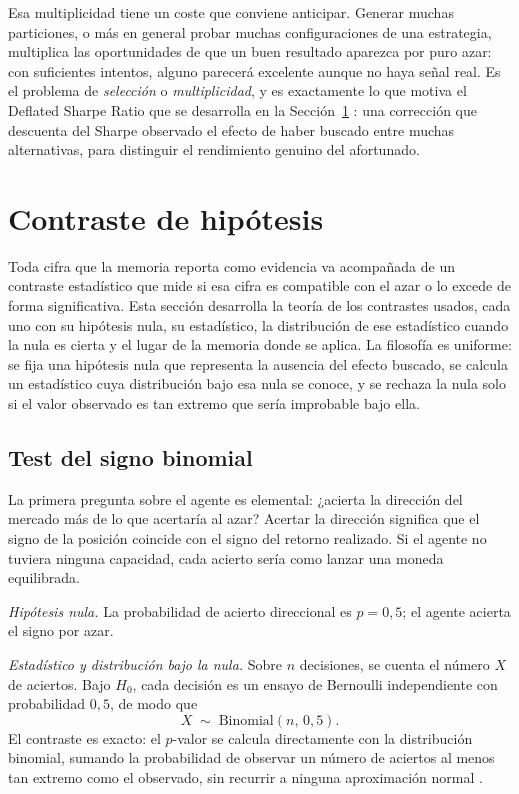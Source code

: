 Esa multiplicidad tiene un coste que conviene anticipar. Generar muchas particiones, o más en general probar muchas configuraciones de una estrategia, multiplica las oportunidades de que un buen resultado aparezca por puro azar: con suficientes intentos, alguno parecerá excelente aunque no haya señal real. Es el problema de \emph{selección} o \emph{multiplicidad}, y es exactamente lo que motiva el Deflated Sharpe Ratio que se desarrolla en la Sección~\ref{sec:tests} \cite{bailey2014}: una corrección que descuenta del Sharpe observado el efecto de haber buscado entre muchas alternativas, para distinguir el rendimiento genuino del afortunado.

\section{Contraste de hipótesis}
\label{sec:tests}

Toda cifra que la memoria reporta como evidencia va acompañada de un contraste estadístico que mide si esa cifra es compatible con el azar o lo excede de forma significativa. Esta sección desarrolla la teoría de los contrastes usados, cada uno con su hipótesis nula, su estadístico, la distribución de ese estadístico cuando la nula es cierta y el lugar de la memoria donde se aplica. La filosofía es uniforme: se fija una hipótesis nula que representa la ausencia del efecto buscado, se calcula un estadístico cuya distribución bajo esa nula se conoce, y se rechaza la nula solo si el valor observado es tan extremo que sería improbable bajo ella.

\subsection{Test del signo binomial}
\label{sec:tests-sign}

La primera pregunta sobre el agente es elemental: ¿acierta la dirección del mercado más de lo que acertaría al azar? Acertar la dirección significa que el signo de la posición coincide con el signo del retorno realizado. Si el agente no tuviera ninguna capacidad, cada acierto sería como lanzar una moneda equilibrada.

\emph{Hipótesis nula.} La probabilidad de acierto direccional es $p = 0{,}5$; el agente acierta el signo por azar.

\emph{Estadístico y distribución bajo la nula.} Sobre $n$ decisiones, se cuenta el número $X$ de aciertos. Bajo $H_0$, cada decisión es un ensayo de Bernoulli independiente con probabilidad $0{,}5$, de modo que
\[
X \;\sim\; \mathrm{Binomial}(n,\, 0{,}5).
\]
El contraste es exacto: el $p$-valor se calcula directamente con la distribución binomial, sumando la probabilidad de observar un número de aciertos al menos tan extremo como el observado, sin recurrir a ninguna aproximación normal \cite{conover1999}.

